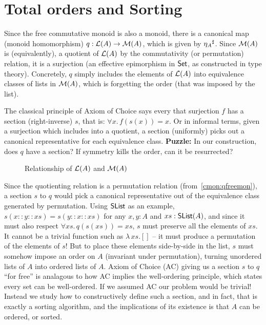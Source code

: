 
\section{Total orders and Sorting}
\label{sec:sorting}

Since the free commutative monoid is also a monoid, there is a canonical map (monoid homomorphism)
$q : \mathcal{L}(A) \to \mathcal{M}(A)$, which is given by ${\eta_A}^{\sharp}$.
%
Since $\mathcal{M}(A)$ is (equivalently), a quotient of $\mathcal{L}(A)$ by the commutativity (or permutation) relation,
it is a surjection (an effective epimorphism in $\mathsf{Set}$, as constructed in type theory).
%
Concretely, $q$ simply includes the elements of $\mathcal{L}(A)$ into equivalence classes of lists in $\mathcal{M}(A)$,
which is forgetting the order (that was imposed by the list).

The classical principle of Axiom of Choice says every that surjection $f$ has a section (right-inverse) $s$, that is:
$\forall x.\, f(s(x)) = x$. Or in informal terms, given a surjection which includes into a quotient, a section
(uniformly) picks out a canonical representative for each equivalence class.
%
\textbf{Puzzle:} In our construction, does $q$ have a section? If symmetry kills the order, can it be resurrected?

\begin{figure}[H]
    \centering
    \caption{Relationship of $\mathcal{L}(A)$ and $\mathcal{M}(A)$}
    \label{fig:enter-label}
\end{figure}

Since the quotienting relation is a permutation relation (from~\cref{cmon:qfreemon}), a section $s$ to $q$ would pick a
canonical representative out of the equivalence class generated by permutation.
%
Using $\operatorname{\mathsf{SList}}$ as an example, $s(x :: y :: xs) = s(y :: x :: xs)$ for any $x, y : A$ and $xs : \operatorname{\mathsf{SList}}(A)$,
and since it must also respect $\forall xs.\,q(s(xs)) = xs$, $s$ must preserve all the elements of $xs$.
It cannot be a trivial function such as $\lambda\,xs. []$ -- it must produce a permutation of the elements of $s$!
%
But to place these elements side-by-side in the list, $s$ must somehow impose an order on $A$
(invariant under permutation), turning unordered lists of $A$ into ordered lists of $A$.
%
Axiom of Choice (AC) giving us a section $s$ to $q$ ``for free'' is analagous to how
AC implies the well-ordering principle, which states every set can be well-ordered.
%
If we assumed AC our problem would be trivial!
%
Instead we study how to constructively define such a section, and in fact, that is exactly a sorting algorithm,
and the implications of its existence is that $A$ can be ordered, or sorted.

